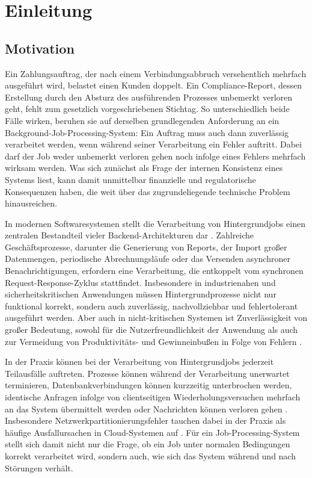 \chapter{Einleitung}
\label{ch:einleitung}
\section{Motivation}
\label{sec:motivation}
Ein Zahlungsauftrag, der nach einem Verbindungsabbruch versehentlich mehrfach ausgeführt wird, belastet einen Kunden doppelt.
Ein Compliance-Report, dessen Erstellung durch den Absturz des ausführenden Prozesses unbemerkt verloren geht, fehlt zum
gesetzlich vorgeschriebenen Stichtag.
So unterschiedlich beide Fälle wirken, beruhen sie auf derselben grundlegenden Anforderung an ein Background-Job-Processing-System:
Ein Auftrag muss auch dann zuverlässig verarbeitet werden, wenn während seiner Verarbeitung ein Fehler auftritt.
Dabei darf der Job weder unbemerkt verloren gehen noch infolge eines Fehlers mehrfach wirksam werden.
Was sich zunächst als Frage der internen Konsistenz eines Systems liest, kann damit unmittelbar finanzielle und regulatorische
Konsequenzen haben, die weit über das zugrundeliegende technische Problem hinausreichen.

In modernen Softwaresystemen stellt die Verarbeitung von Hintergrundjobs einen zentralen Bestandteil vieler Backend-Architekturen
dar \parencite[Kap.~10]{kleppmann_designing_2017}.
Zahlreiche Geschäftsprozesse, darunter die Generierung von Reports, der Import großer Datenmengen, periodische Abrechnungsläufe
oder das Versenden asynchroner Benachrichtigungen, erfordern eine Verarbeitung, die entkoppelt vom synchronen Request-Response-Zyklus stattfindet.
Insbesondere in industrienahen und sicherheitskritischen Anwendungen müssen Hintergrundprozesse nicht nur funktional korrekt,
sondern auch zuverlässig, nachvollziehbar und fehlertolerant ausgeführt werden.
Aber auch in nicht-kritischen Systemen ist Zuverlässigkeit von großer Bedeutung, sowohl für die Nutzerfreundlichkeit der Anwendung
als auch zur Vermeidung von Produktivitäts- und Gewinneinbußen in Folge von Fehlern
\parencite[Kap.~1 Abschnitt \glqq How Important Is Reliability?\grqq]{kleppmann_designing_2017}.

In der Praxis können bei der Verarbeitung von Hintergrundjobs jederzeit Teilausfälle auftreten.
Prozesse können während der Verarbeitung unerwartet terminieren, Datenbankverbindungen können kurzzeitig unterbrochen werden, identische
Anfragen infolge von clientseitigen Wiederholungsversuchen mehrfach an das System übermittelt werden oder
Nachrichten können verloren gehen \parencite[Kap.~8]{kleppmann_designing_2017}.
Insbesondere Netzwerkpartitionierungsfehler tauchen dabei in der Praxis als häufige Ausfallursachen in Cloud-Systemen auf
\parencite{alquraan_analysis_2018}.
Für ein Job-Processing-System stellt sich damit nicht nur die Frage, ob ein Job unter normalen Bedingungen korrekt verarbeitet wird,
sondern auch, wie sich das System während und nach Störungen verhält.

